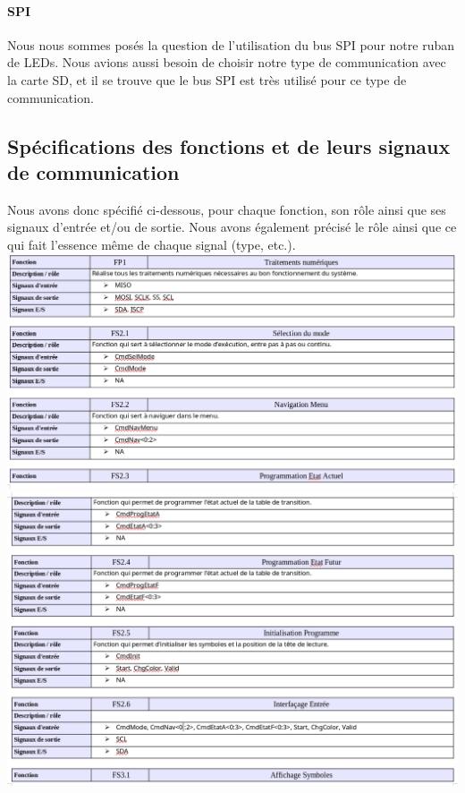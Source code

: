\documentclass[12pt]{report}
\begin{document}
	\paragraph{SPI}
	Nous nous sommes posés la question de l'utilisation du bus SPI pour notre ruban de LEDs. Nous avions aussi besoin de choisir notre type de communication avec la carte SD, et il se trouve que le bus SPI est très utilisé pour ce type de communication.\\
	\subsection{Spécifications des fonctions et de leurs signaux de communication}
	Nous avons donc spécifié ci-dessous, pour chaque fonction, son rôle ainsi que ses signaux d'entrée et/ou de sortie. Nous avons également précisé le rôle ainsi que ce qui fait l'essence même de chaque signal (type, etc.).\\
	\includegraphics[width=\textwidth]{img/f1}
	\includegraphics[width=\textwidth]{img/f2}
\end{document}
